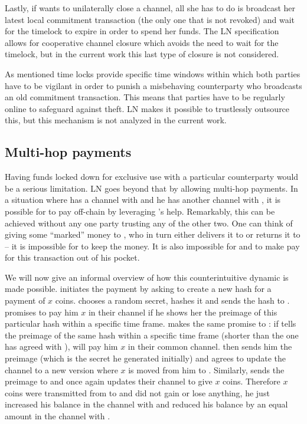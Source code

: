     Lastly, if \alice{} wants to unilaterally close a channel, all she has to do
    is broadcast her latest local commitment transaction (the only one that is
    not revoked) and wait for the timelock to expire in order to spend her
    funds. The LN specification allows for cooperative channel closure which
    avoids the need to wait for the timelock, but in the current work this last
    type of closure is not considered.

    As mentioned time locks provide specific time windows within which both
    parties have to be vigilant in order to punish a misbehaving  counterparty
    who  broadcasts an old commitment transaction. This means that parties have
    to be regularly online to safeguard against theft. LN makes it possible to
    trustlessly outsource this, but this mechanism is not analyzed in the
    current work.

  \subsection{Multi-hop payments}

    Having funds locked down for exclusive use with a particular counterparty
    would be a serious limitation. LN goes beyond that by allowing multi-hop
    payments. In a situation where \alice{} has a channel with \bob{} and he has
    another channel with \charlie{}, it is possible for \alice{} to pay
    \charlie{} off-chain by leveraging \bob's help. Remarkably, this can be
    achieved without any one party trusting any of the other two. One can think
    of \alice{} giving some ``marked'' money to \bob{}, who in turn either
    delivers it to \charlie{} or returns it to \alice{} -- it is impossible for
    \bob{} to keep the money. It is also impossible for \alice{} and \charlie{}
    to make \bob{} pay for this transaction out of his pocket.

    We will now give an informal overview of how this counterintuitive dynamic
    is made possible. \alice{} initiates the payment by asking \charlie{} to
    create a new hash for a payment of $x$ coins. \charlie{} chooses a random
    secret, hashes it and sends the hash to \alice. \alice{} promises \bob{} to
    pay him $x$ in their channel if he shows her the preimage of this particular
    hash within a specific time frame. \bob{} makes the same promise to
    \charlie{}: if \charlie{} tells \bob{} the preimage of the same hash within
    a specific time frame (shorter than the one \bob{} has agreed with
    \alice{}), \bob{} will pay him $x$ in their common channel. \charlie{} then
    sends him the preimage (which is the secret he generated initially) and
    \bob{} agrees to update the channel to a new version where $x$ is moved from
    him to \charlie. Similarly, \bob{} sends the preimage to \alice{} and once
    again \alice{} updates their channel to give \bob{} $x$ coins. Therefore $x$
    coins were transmitted from \alice{} to \charlie{} and \bob{} did not gain
    or lose anything, he just increased his balance in the channel with \alice{}
    and reduced his balance by an equal amount in the channel with \charlie.

